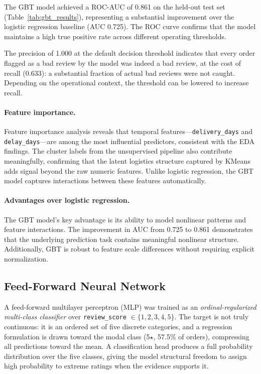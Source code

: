 \documentclass[11pt]{article}
\begin{document}
The GBT model achieved a ROC-AUC of 0.861 on the held-out test set (Table~\ref{tab:gbt_results}), representing a substantial improvement over the logistic regression baseline (AUC 0.725). The ROC curve confirms that the model maintains a high true positive rate across different operating thresholds.

The precision of 1.000 at the default decision threshold indicates that every order flagged as a bad review by the model was indeed a bad review, at the cost of recall (0.633): a substantial fraction of actual bad reviews were not caught. Depending on the operational context, the threshold can be lowered to increase recall.

\paragraph{Feature importance.}

Feature importance analysis reveals that temporal features---\texttt{delivery\_days} and \texttt{delay\_days}---are among the most influential predictors, consistent with the EDA findings. The cluster labels from the unsupervised pipeline also contribute meaningfully, confirming that the latent logistics structure captured by KMeans adds signal beyond the raw numeric features. Unlike logistic regression, the GBT model captures interactions between these features automatically.

\paragraph{Advantages over logistic regression.}

The GBT model's key advantage is its ability to model nonlinear patterns and feature interactions. The improvement in AUC from 0.725 to 0.861 demonstrates that the underlying prediction task contains meaningful nonlinear structure. Additionally, GBT is robust to feature scale differences without requiring explicit normalization.

\subsection{Feed-Forward Neural Network}
\label{sec:dnn}

A feed-forward multilayer perceptron (MLP) was trained as an \textit{ordinal-regularized multi-class classifier} over \texttt{review\_score} $\in \{1,2,3,4,5\}$. The target is not truly continuous: it is an ordered set of five discrete categories, and a regression formulation is drawn toward the modal class (5$\star$, 57.5\% of orders), compressing all predictions toward the mean. A classification head produces a full probability distribution over the five classes, giving the model structural freedom to assign high probability to extreme ratings when the evidence supports it.
\end{document}
